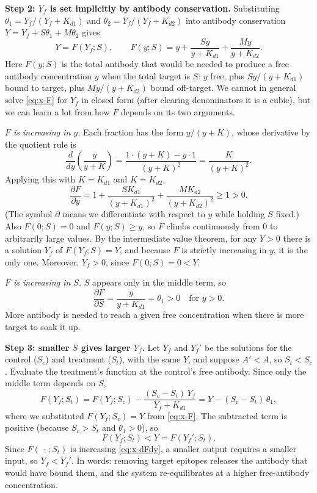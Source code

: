 \textbf{Step 2: $Y_f$ is set implicitly by antibody conservation.}
Substituting $\theta_1=Y_f/(Y_f+K_{d1})$ and $\theta_2=Y_f/(Y_f+K_{d2})$
into antibody conservation $Y=Y_f+S\theta_1+M\theta_2$ gives
\begin{equation}
Y=F(Y_f;S),
\qquad
F(y;S)=y+\frac{Sy}{y+K_{d1}}+\frac{My}{y+K_{d2}}.
\label{eq:x-F}
\end{equation}
Here $F(y;S)$ is the total antibody that would be needed to produce a free
antibody concentration $y$ when the total target is $S$: $y$ free, plus
$Sy/(y+K_{d1})$ bound to target, plus $My/(y+K_{d2})$ bound off-target.
We cannot in general solve \eqref{eq:x-F} for $Y_f$ in closed form (after
clearing denominators it is a cubic), but we can learn a lot from how $F$
depends on its two arguments.

\emph{$F$ is increasing in $y$.} Each fraction has the form
$y/(y+K)$, whose derivative by the quotient rule is
$$
\frac{d}{dy}\left(\frac{y}{y+K}\right)
=\frac{1\cdot(y+K)-y\cdot1}{(y+K)^2}
=\frac{K}{(y+K)^2}.
$$
Applying this with $K=K_{d1}$ and $K=K_{d2}$,
\begin{equation}
\frac{\partial F}{\partial y}
=1+\frac{SK_{d1}}{(y+K_{d1})^2}+\frac{MK_{d2}}{(y+K_{d2})^2}
\ge1>0.
\label{eq:x-dFdy}
\end{equation}
(The symbol $\partial$ means we differentiate with respect to $y$ while
holding $S$ fixed.) Also $F(0;S)=0$ and $F(y;S)\ge y$, so $F$ climbs
continuously from $0$ to arbitrarily large values. By the intermediate
value theorem, for any $Y>0$ there is a solution $Y_f$ of
$F(Y_f;S)=Y$, and because $F$ is strictly increasing in $y$, it is the only
one. Moreover, $Y_f>0$, since $F(0;S)=0<Y$.

\emph{$F$ is increasing in $S$.} $S$ appears only in the middle term, so
$$
\frac{\partial F}{\partial S}=\frac{y}{y+K_{d1}}=\theta_1>0
\quad\text{for } y>0.
$$
More antibody is needed to reach a given free concentration when there
is more target to soak it up.

\textbf{Step 3: smaller $S$ gives larger $Y_f$.} Let $Y_f$ and $Y_f'$ be
the solutions for the control ($S_c$) and treatment ($S_t$), with the same
$Y$, and suppose $A'<A$, so $S_t<S_c$. Evaluate the treatment's function
at the control's free antibody. Since only the middle term depends on
$S$,
$$
F(Y_f;S_t)
=F(Y_f;S_c)-\frac{(S_c-S_t)\,Y_f}{Y_f+K_{d1}}
=Y-(S_c-S_t)\,\theta_1,
$$
where we substituted $F(Y_f;S_c)=Y$ from \eqref{eq:x-F}. The subtracted
term is positive (because $S_c>S_t$ and $\theta_1>0$), so
$$
F(Y_f;S_t)<Y=F(Y_f';S_t).
$$
Since $F(\,\cdot\,;S_t)$ is increasing \eqref{eq:x-dFdy}, a smaller output
requires a smaller input, so $Y_f<Y_f'$. In words: removing target
epitopes releases the antibody that would have bound them, and the
system re-equilibrates at a higher free-antibody concentration.

